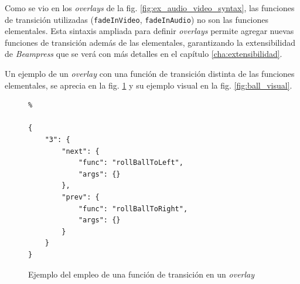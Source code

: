 		
		Como se vio en los \textit{overlays} de la fig. \ref{fig:ex_audio_video_syntax}, las funciones de transición utilizadas (\texttt{fadeInVideo}, \texttt{fadeInAudio}) no son las funciones elementales. Esta sintaxis ampliada para definir \textit{overlays} permite agregar nuevas funciones de transición además de las elementales, garantizando la extensibilidad de \textit{Beampress} que se verá con más detalles en el capítulo \ref{cha:extensibilidad}.


		Un ejemplo de un \textit{overlay} con una función de transición distinta de las funciones elementales, se aprecia en la fig. \ref{fig:ball_code} y su ejemplo visual en la fig. \ref{fig:ball_visual}.



		\begin{figure}[htb]%
			\begin{lstlisting}%

{
    "3": {
        "next": {
            "func": "rollBallToLeft",
            "args": {}
        },
        "prev": {
            "func": "rollBallToRight",
            "args": {}
        }
    }
}
			\end{lstlisting}
		\caption{Ejemplo del empleo de una función de transición en un \textit{overlay}} 
			\label{fig:ball_code} 
		\end{figure}	




